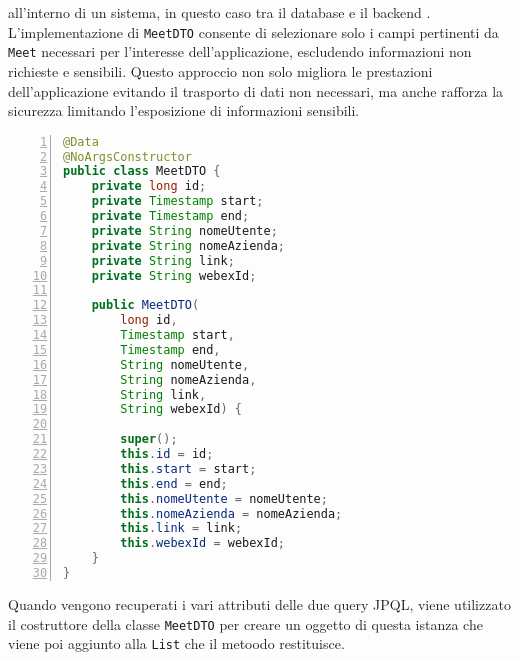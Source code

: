 all'interno di un sistema, in questo caso tra il database e il backend \cite{DataTransferObject}. L'implementazione di \texttt{MeetDTO} consente di selezionare 
solo i campi pertinenti da \texttt{Meet} necessari per l'interesse dell'applicazione, escludendo informazioni non richieste e sensibili.
Questo approccio non solo migliora le prestazioni dell'applicazione evitando il trasporto di dati non necessari, 
ma anche rafforza la sicurezza limitando l'esposizione di informazioni sensibili.
\begin{lstlisting}[language=java, frame=lines, basicstyle=\ttfamily\scriptsize, numbers=left]
@Data
@NoArgsConstructor
public class MeetDTO {
    private long id;
    private Timestamp start;
    private Timestamp end;
    private String nomeUtente;
    private String nomeAzienda;
    private String link;
    private String webexId;
        
    public MeetDTO(
        long id, 
        Timestamp start, 
        Timestamp end, 
        String nomeUtente, 
        String nomeAzienda, 
        String link,
        String webexId) {
            
        super();
        this.id = id;
        this.start = start;
        this.end = end;
        this.nomeUtente = nomeUtente;
        this.nomeAzienda = nomeAzienda;
        this.link = link;
        this.webexId = webexId;
    }       
}
\end{lstlisting}
Quando vengono recuperati i vari attributi delle due query JPQL, 
viene utilizzato il costruttore della classe \texttt{MeetDTO} per creare un 
oggetto di questa istanza che viene poi aggiunto alla \texttt{List} che il metoodo restituisce.